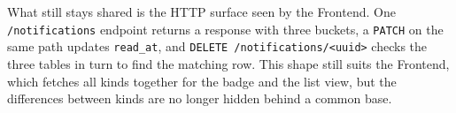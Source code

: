What still stays shared is the HTTP surface seen by the Frontend. One
\texttt{/notifications} endpoint returns a response with three
buckets, a \texttt{PATCH} on the same path updates \texttt{read\_at},
and \texttt{DELETE /notifications/<uuid>} checks the three tables in
turn to find the matching row. This shape still suits the Frontend,
which fetches all kinds together for the badge and the list view, but
the differences between kinds are no longer hidden behind a common
base.
